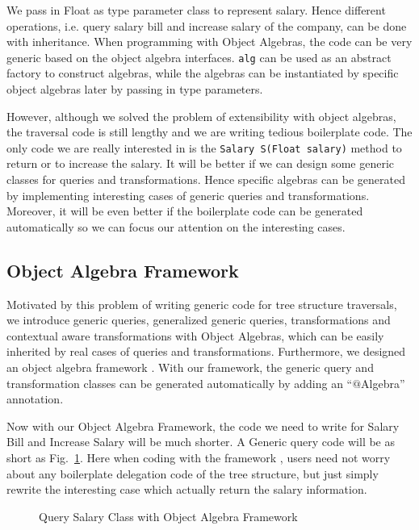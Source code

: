  
We pass in Float as type parameter class to represent salary. Hence different operations, i.e. query salary bill and increase salary of the company, can be done with inheritance. When programming with Object Algebras, the code can be very generic based on the object algebra interfaces. \lstinline{alg} can be used as an abstract factory to construct algebras, while the algebras can be instantiated by specific object algebras later by passing in type parameters. 

However, although we solved the problem of extensibility with object algebras, the traversal code is still lengthy and we are writing tedious boilerplate code. The only code we are really interested in is the \lstinline{Salary S(Float salary)} method to return or to increase the salary. It will be better if we can design some generic classes for queries and transformations. Hence specific algebras can be generated by
implementing interesting cases of generic queries and
transformations. Moreover, it will be even better if the boilerplate code can be generated automatically so we can focus our attention on the interesting cases.

\subsection{Object Algebra Framework}

Motivated by this problem of writing generic code for tree structure
traversals, we introduce generic queries, generalized generic queries, transformations and contextual aware transformations with Object Algebras, which can be easily inherited by real cases of queries and transformations. Furthermore, we designed an object algebra framework \name. With our framework, the generic query and transformation classes can be generated automatically by adding an ``$@$Algebra'' annotation.

Now with our Object Algebra Framework, the code we need to write for Salary Bill and Increase Salary will be much shorter. A Generic query code will be as short as Fig.~\ref{query_with_oaframework}. Here when coding with the framework \name, users need not worry about any boilerplate delegation code of the tree structure, but just simply rewrite the interesting case which actually return the salary information.
\begin{figure}[tb]
\vspace{-.1in}
\caption{Query Salary Class with Object Algebra Framework}
\label{query_with_oaframework}
\end{figure}



